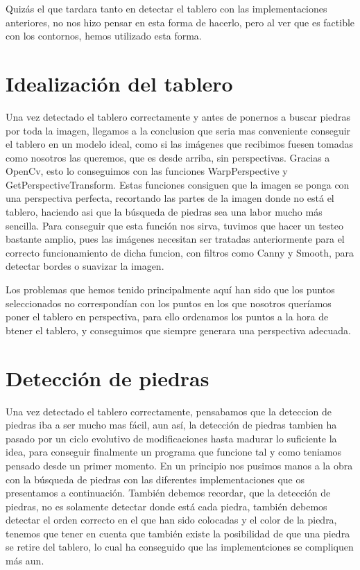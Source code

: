 \documentclass[12pt,a4paper]{report}
\begin{document}
Quizás el que tardara tanto en detectar el tablero con las implementaciones
anteriores, no nos hizo pensar en esta forma de hacerlo, pero al ver que es
factible con los contornos, hemos utilizado esta forma.



\section{Idealización del tablero} 

Una vez detectado el tablero correctamente y antes de ponernos a buscar piedras
por toda la imagen, llegamos a la conclusion que seria mas conveniente conseguir
el tablero en un modelo ideal, como si las imágenes que recibimos fuesen tomadas
como nosotros las queremos, que es desde arriba, sin perspectivas.  Gracias a
OpenCv, esto lo conseguimos con las funciones WarpPerspective y
GetPerspectiveTransform. Estas funciones consiguen que la imagen se ponga con
una perspectiva perfecta, recortando las partes de la imagen donde no está el
tablero, haciendo asi que la búsqueda de piedras sea una labor mucho más
sencilla. Para conseguir que esta función nos sirva, tuvimos que hacer un testeo
bastante amplio, pues las imágenes necesitan ser tratadas anteriormente para el
correcto funcionamiento de dicha funcion, con filtros como Canny y Smooth, para
detectar bordes o suavizar la imagen. 

Los problemas que hemos tenido principalmente aquí han sido que los puntos
seleccionados no correspondían con los puntos en los que nosotros queríamos
poner el tablero en perspectiva, para ello ordenamos los puntos a la hora de
btener el tablero, y conseguimos que siempre generara una perspectiva adecuada. 



\section{Detección de piedras} 

Una vez detectado el tablero correctamente, pensabamos que la deteccion de
piedras iba a ser mucho mas fácil, aun así, la detección de piedras tambien ha
pasado por un ciclo evolutivo de modificaciones hasta madurar lo suficiente la
idea, para conseguir finalmente un programa que funcione tal y como teniamos
pensado desde un primer momento. En un principio nos pusimos manos a la obra con
la búsqueda de piedras con las diferentes implementaciones que os presentamos a
continuación. También debemos recordar, que la detección de piedras, no es
solamente detectar donde está cada piedra, también debemos detectar el orden
correcto en el que han sido colocadas y el color de la piedra, tenemos que tener
en cuenta que también existe la posibilidad de que una piedra se retire del
tablero, lo cual ha conseguido que las implementciones se compliquen más aun.   
\end{document}

